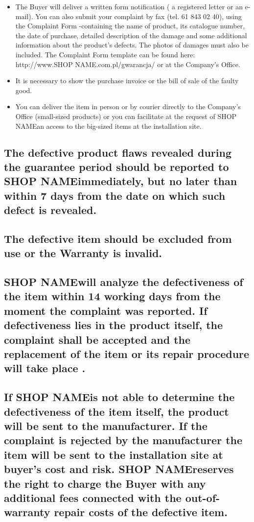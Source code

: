 \documentclass[10pt,a4paper]{article}
\newcommand{\shopname}{SHOP NAME}
\begin{document}
\begin{itemize}

\item The Buyer will deliver a written form notification ( a registered letter or an e-mail).
You can also submit your complaint by fax (tel. 61 843 02 40), using the Complaint Form -containing the name of product, its catalogue number, the date of purchase, detailed description of the damage and some additional information about the product’s defects. The photos of damages must also be included. The Complaint Form template can be found here: http://www.\shopname.com.pl/gwarancja/  or at the Company’s Office.
\item It is necessary to show the  purchase invoice  or the bill of sale of the faulty good.
\item You can deliver the item in person or  by courier directly to  the Company’s Office (small-sized products) or you can facilitate at the request of \shopname an access to the big-sized items  at the installation site.

\end{itemize}

\subsection{The defective product flaws revealed during the guarantee period should be reported to \shopname immediately, but no later than within 7 days from the date on which such defect is revealed.}

\subsection{The defective item should  be excluded from use or the Warranty is invalid.}

\subsection{\shopname will analyze the defectiveness of the item  within 14 working days from the moment the complaint was reported. If defectiveness lies in the product itself, the complaint shall be accepted and the replacement of the item or its repair procedure will take place .}

\subsection{If \shopname is not able to determine the defectiveness of the item itself, the product will be sent to the manufacturer. If the complaint is rejected by the manufacturer the item will be sent to the  installation site at buyer’s cost and risk.
 \shopname reserves the right to charge the Buyer with any additional fees connected with the out-of-warranty repair costs of the defective item.}
\end{document}
